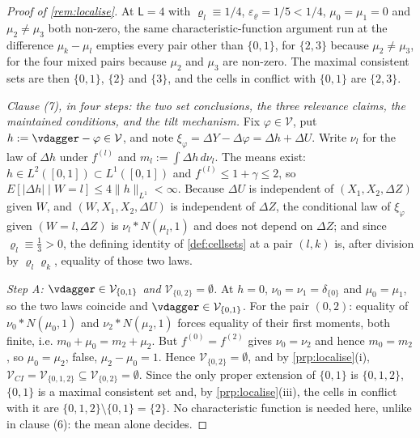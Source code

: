 \begin{proof}[Proof of \cref{rem:localise}]
At $\mathsf L=4$ with $\varrho_l\equiv1/4$, $\varepsilon_\varrho=1/5<1/4$, $\mu_0=\mu_1=0$ and
$\mu_2\neq\mu_3$ both non-zero, the same characteristic-function argument run at the difference
$\mu_k-\mu_l$ empties every pair other than $\{0,1\}$, for $\{2,3\}$ because $\mu_2\neq\mu_3$, for
the four mixed pairs because $\mu_2$ and $\mu_3$ are non-zero. The maximal consistent sets are then
$\{0,1\}$, $\{2\}$ and $\{3\}$, and the cells in conflict with $\{0,1\}$ are $\{2,3\}$.

\emph{Clause \textup{(7)}, in four steps: the two set conclusions, the three relevance claims, the
maintained conditions, and the tilt mechanism.} Fix $\varphi\in\mathcal V$, put
$h:=\vdagger-\varphi\in\mathcal V$, and note $\xi_\varphi=\Delta Y-\Delta\varphi=\Delta h+\Delta U$.
Write $\nu_l$ for the law of $\Delta h$ under $f^{(l)}$ and $m_l:=\int\Delta h\,d\nu_l$. The means
exist: $h\in L^{2}([0,1])\subset L^{1}([0,1])$ and $f^{(l)}\le1+\gamma\le2$, so
$E[|\Delta h|\mid W=l]\le4\|h\|_{L^{1}}<\infty$. Because $\Delta U$ is independent of
$(X_1,X_2,\Delta Z)$ given $W$, and $(W,X_1,X_2,\Delta U)$ is independent of $\Delta Z$, the
conditional law of $\xi_\varphi$ given $(W=l,\Delta Z)$ is $\nu_l\ast N(\mu_l,1)$ and does not depend
on $\Delta Z$; and since $\varrho_l\equiv\tfrac13>0$, the defining identity of \cref{def:cellsets} at a
pair $(l,k)$ is, after division by $\varrho_l\varrho_k$, equality of those two laws.

\emph{Step A: $\vdagger\in\mathcal V_{\{0,1\}}$ and $\mathcal V_{\{0,2\}}=\emptyset$.} At $h=0$,
$\nu_0=\nu_1=\delta_{\{0\}}$ and $\mu_0=\mu_1$, so the two laws coincide and
$\vdagger\in\mathcal V_{\{0,1\}}$. For the pair $(0,2)$: equality of $\nu_0\ast N(\mu_0,1)$ and
$\nu_2\ast N(\mu_2,1)$ forces equality of their first moments, both finite, i.e.
$m_0+\mu_0=m_2+\mu_2$. But $f^{(0)}=f^{(2)}$ gives $\nu_0=\nu_2$ and hence $m_0=m_2$, so
$\mu_0=\mu_2$, false, $\mu_2-\mu_0=1$. Hence $\mathcal V_{\{0,2\}}=\emptyset$, and by
\cref{prp:localise}\textup{(i)}, $\mathcal V_{CI}=\mathcal V_{\{0,1,2\}}\subseteq\mathcal V_{\{0,2\}}=\emptyset$.
Since the only proper extension of $\{0,1\}$ is $\{0,1,2\}$, $\{0,1\}$ is a maximal consistent set and,
by \cref{prp:localise}\textup{(iii)}, the cells in conflict with it are $\{0,1,2\}\setminus\{0,1\}=\{2\}$.
No characteristic function is needed here, unlike in clause \textup{(6)}: the mean alone decides.


\end{proof}
